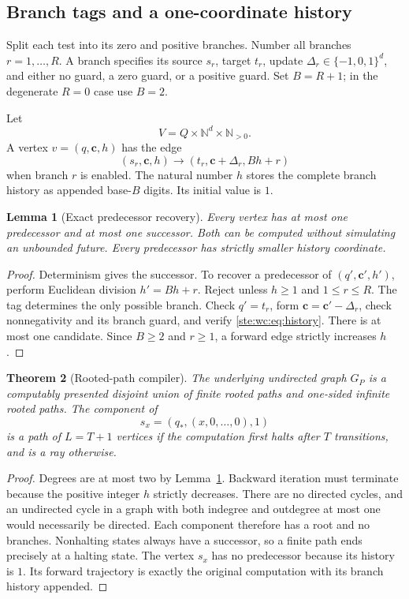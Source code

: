 \documentclass[11pt,letterpaper]{article}
\newtheorem{theorem}{Theorem}[section]
\newtheorem{lemma}[theorem]{Lemma}
\theoremstyle{definition}
\theoremstyle{remark}
\newcommand{\N}{\mathbb N}
\begin{document}
\subsection{Branch tags and a one-coordinate history}
Split each test into its zero and positive branches. Number all branches
$r=1,\ldots,R$. A branch specifies its source $s_r$, target $t_r$, update
$\Delta_r\in\{-1,0,1\}^d$, and either no guard, a zero guard, or a positive
guard. Set $B=R+1$; in the degenerate $R=0$ case use $B=2$.

Let
\[
 V=Q\times\N^d\times\N_{>0}.
\]
A vertex $v=(q,\bm c,h)$ has the edge
\begin{equation}\label{ste:wc:eq:history}
 (s_r,\bm c,h)\longrightarrow
 (t_r,\bm c+\Delta_r,Bh+r)
\end{equation}
when branch $r$ is enabled. The natural number $h$ stores the complete
branch history as appended base-$B$ digits. Its initial value is $1$.

\begin{lemma}[Exact predecessor recovery]\label{ste:wc:lem:predecessor}
Every vertex has at most one predecessor and at most one successor. Both
can be computed without simulating an unbounded future. Every predecessor
has strictly smaller history coordinate.
\end{lemma}
\begin{proof}
Determinism gives the successor. To recover a predecessor of
$(q',\bm c',h')$, perform Euclidean division $h'=Bh+r$. Reject unless
$h\geq1$ and $1\leq r\leq R$. The tag determines the only possible branch.
Check $q'=t_r$, form $\bm c=\bm c'-\Delta_r$, check nonnegativity and its
branch guard, and verify \eqref{ste:wc:eq:history}. There is at most one candidate.
Since $B\geq2$ and $r\geq1$, a forward edge strictly increases $h$.
\end{proof}

\begin{theorem}[Rooted-path compiler]\label{ste:wc:thm:paths}
The underlying undirected graph $G_P$ is a computably presented disjoint
union of finite rooted paths and one-sided infinite rooted paths. The
component of
\[
 s_x=(q_*,(x,0,\ldots,0),1)
\]
is a path of $L=T+1$ vertices if the computation first halts after $T$
transitions, and is a ray otherwise.
\end{theorem}
\begin{proof}
Degrees are at most two by Lemma~\ref{ste:wc:lem:predecessor}. Backward iteration must
terminate because the positive integer $h$ strictly decreases. There are
no directed cycles, and an undirected cycle in a graph with both indegree
and outdegree at most one would necessarily be directed. Each component
therefore has a root and no branches. Nonhalting states always have a
successor, so a finite path ends precisely at a halting state. The vertex
$s_x$ has no predecessor because its history is $1$. Its forward trajectory
is exactly the original computation with its branch history appended.
\end{proof}
\end{document}
